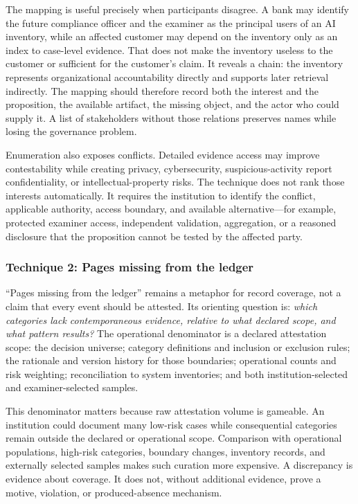 The mapping is useful precisely when participants disagree. A bank may identify
the future compliance officer and the examiner as the principal users of an AI
inventory, while an affected customer may depend on the inventory only as an
index to case-level evidence. That does not make the inventory useless to the
customer or sufficient for the customer's claim. It reveals a chain: the
inventory represents organizational accountability directly and supports later
retrieval indirectly. The mapping should therefore record both the interest and
the proposition, the available artifact, the missing object, and the actor who
could supply it. A list of stakeholders without those relations preserves names
while losing the governance problem.

Enumeration also exposes conflicts. Detailed evidence access may improve
contestability while creating privacy, cybersecurity, suspicious-activity
report confidentiality, or intellectual-property risks. The technique does not
rank those interests automatically. It requires the institution to identify the
conflict, applicable authority, access boundary, and available alternative---for
example, protected examiner access, independent validation, aggregation, or a
reasoned disclosure that the proposition cannot be tested by the affected party.

\subsubsection{Technique 2: Pages missing from the ledger}
\label{sec:diagnostics:pages-missing}

``Pages missing from the ledger'' remains a metaphor for record coverage, not a
claim that every event should be attested. Its orienting question is: \emph{which
categories lack contemporaneous evidence, relative to what declared scope, and
what pattern results?} The operational denominator is a declared attestation
scope: the decision universe; category definitions and inclusion or exclusion
rules; the rationale and version history for those boundaries; operational
counts and risk weighting; reconciliation to system inventories; and both
institution-selected and examiner-selected samples.

This denominator matters because raw attestation volume is gameable. An
institution could document many low-risk cases while consequential categories
remain outside the declared or operational scope. Comparison with operational
populations, high-risk categories, boundary changes, inventory records, and
externally selected samples makes such curation more expensive. A discrepancy
is evidence about coverage. It does not, without additional evidence, prove a
motive, violation, or produced-absence mechanism.

